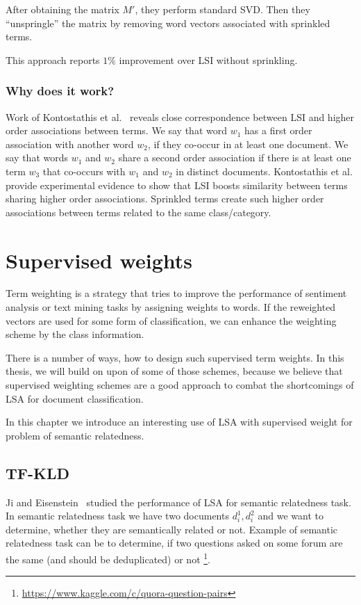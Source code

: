     After obtaining the matrix $M'$, they perform standard SVD. 
    Then they ``unspringle'' the matrix by removing word vectors associated with sprinkled terms.
    
    This approach reports $1\%$ improvement over LSI without sprinkling.
    
    \subsubsection{Why does it work?}
    Work of Kontostathis et al.~\cite{kontostathis2006framework} reveals close correspondence between LSI and higher order associations between terms. 
    We say that word $w_1$ has a first order association with another word $w_2$, if they co-occur in at least one document. 
    We say that words $w_1$ and $w_2$ share a second order association if there is at least one term $w_3$ that co-occurs with $w_1$ and $w_2$ in distinct documents. 
    Kontostathis et al. provide experimental evidence to show that LSI boosts similarity between terms sharing higher order associations. 
    Sprinkled terms create such higher order associations between terms related to  the same class/category.
        
\section{Supervised weights}
    
    Term weighting is a strategy that tries to improve the performance of sentiment analysis or text mining tasks by assigning weights to words.
    If the reweighted vectors are used for some form of classification,
    we can enhance the weighting scheme by the class information.
    
    There is a number of ways, how to design such supervised term weights.
    In this thesis, we will build on upon of some of those schemes,
    because we believe that supervised weighting schemes are a good approach to combat the shortcomings of LSA for document classification.
    
    In this chapter we introduce an interesting use of LSA with supervised weight for problem of semantic relatedness.

    \subsection{TF-KLD}
        Ji and Eisenstein~\cite{ji2013discriminative} %
        studied the performance of LSA for semantic relatedness task.
        In semantic relatedness task we have two documents $d_i^1, d_i^2$ and we want to determine, whether they are semantically related or not. 
        Example of semantic relatedness task can be to determine, if two questions asked on some forum are the same (and should be deduplicated) or not \footnote{\url{https://www.kaggle.com/c/quora-question-pairs}}.
        
